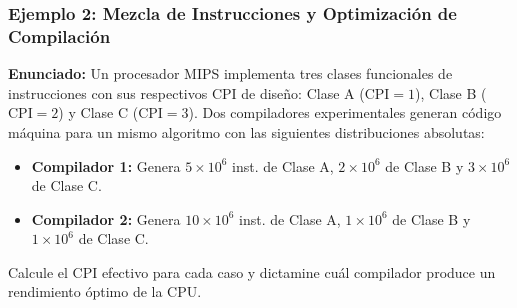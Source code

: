 \documentclass[12pt,letterpaper]{article}
\begin{document}
\subsubsection{Ejemplo 2: Mezcla de Instrucciones y Optimización de Compilación}
\textbf{Enunciado:} Un procesador MIPS implementa tres clases funcionales de instrucciones con sus respectivos CPI de diseño: Clase A ($\text{CPI} = 1$), Clase B ($\text{CPI} = 2$) y Clase C ($\text{CPI} = 3$). Dos compiladores experimentales generan código máquina para un mismo algoritmo con las siguientes distribuciones absolutas:
\begin{itemize}
    \item \textbf{Compilador 1:} Genera $5 \times 10^6$ inst. de Clase A, $2 \times 10^6$ de Clase B y $3 \times 10^6$ de Clase C.
    \item \textbf{Compilador 2:} Genera $10 \times 10^6$ inst. de Clase A, $1 \times 10^6$ de Clase B y $1 \times 10^6$ de Clase C.
\end{itemize}
Calcule el CPI efectivo para cada caso y dictamine cuál compilador produce un rendimiento óptimo de la CPU.
\end{document}
